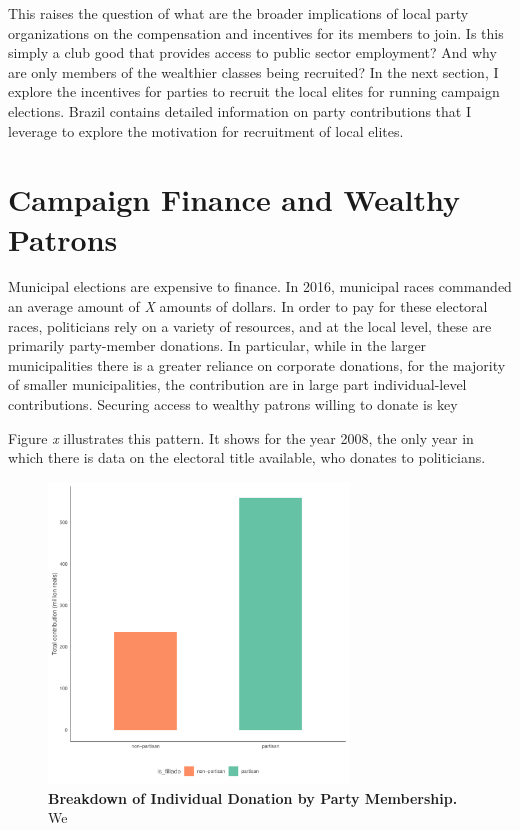 \documentclass[12pt,a4paper]{article}
\begin{document}
This raises the question of what are the broader implications of local party organizations on the compensation and incentives for its members to join. Is this simply a club good that provides access to public sector employment? And why are only members of the wealthier classes being recruited? In the next section, I explore the incentives for parties to recruit the local elites for running campaign elections. Brazil contains detailed information on party contributions that I leverage to explore the motivation for recruitment of local elites. 

\section{Campaign Finance and Wealthy Patrons}
Municipal elections are expensive to finance. In 2016, municipal races commanded an average amount of \emph{X} amounts of dollars. In order to pay for these electoral races, politicians rely on a variety of resources, and at the local level, these are primarily party-member donations. In particular, while in the larger municipalities there is a greater reliance on corporate donations, for the majority of smaller municipalities, the contribution are in large part individual-level contributions. Securing access to wealthy patrons willing to donate is key

Figure \emph{x} illustrates this pattern. It shows for the year 2008, the only year in which there is data on the electoral title available, who donates to politicians. 

\begin{figure}
    \centering
    \includegraphics[width = 8cm, height = 8cm]{figures/partisanship/plot_contribution.pdf}
    \caption{\textbf{Breakdown of Individual Donation by Party Membership.} We }
\end{figure}
\end{document}
